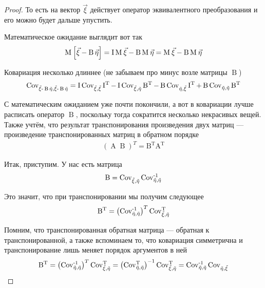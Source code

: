 \begin{proof}
  То есть на вектор $\vec{\xi}$ действует оператор эквивалентного
  преобразования и его можно будет дальше упустить.

  Математическое ожидание выглядит вот так
  \begin{align*}
      \Mean{\vec{\xi} - \operatorname{B} \vec{\eta}}
      = \operatorname{I} \mean{\vec{\xi}} - \operatorname{B} \mean{\vec{\eta}}
      = \mean{\vec{\xi}} - \operatorname{B} \mean{\vec{\eta}}
  \end{align*}

  Ковариация несколько длиннее (не забываем про минус возле матрицы
  $\operatorname{B}$)
  \begin{equation}\label{eq:gaussianVector:independent:covariation}
      \dCov{\vec{\xi} - \operatorname{B} \vec{\eta}}
      = \operatorname{I} \dCov{\vec{\xi}} \operatorname{I^T}
      - \operatorname{I} \Cov{\vec{\xi}}{\vec{\eta}} \operatorname{B^T}
      - \operatorname{B} \Cov{\vec{\eta}}{\vec{\xi}} \operatorname{I^T}
      + \operatorname{B} \dCov{\vec{\eta}} \operatorname{B^T}
  \end{equation}

  С математическим ожиданием уже почти покончили, а вот в ковариации лучше
  расписать оператор $\operatorname{B}$, поскольку тогда сократится несколько
  некрасивых вещей. Также учтём, что результат транспонирования произведения
  двух матриц --- произведение транспонированных матриц в обратном порядке
  \begin{align*}
      \left( \operatorname{A} \operatorname{B} \right)^T
      = \operatorname{B^T} \operatorname{A^T}
  \end{align*}

  Итак, приступим. У нас есть матрица
  \begin{align*}
      \operatorname{B} = \Cov{\vec{\xi}}{\vec{\eta}} \dCov[-1]{\vec{\eta}}
  \end{align*}

  Это значит, что при транспонировании мы получим следующее
  \begin{align*}
      \operatorname{B^T}
      = \left( \dCov[-1]{\vec{\eta}} \right)^T
          \Cov[T]{\vec{\xi}}{\vec{\eta}}
  \end{align*}

  Помним, что транспонированная обратная матрица --- обратная к
  транспонированной, а также вспоминаем то, что ковариация симметрична
  и транспонирование лишь меняет порядок аргументов в ней
  \begin{align*}
      \operatorname{B^T}
      = \left( \dCov[-1]{\vec{\eta}} \right)^T
          \Cov[T]{\vec{\xi}}{\vec{\eta}}
      = \left( \dCov[T]{\vec{\eta}} \right)^{-1}
          \Cov[T]{\vec{\xi}}{\vec{\eta}}
      = \dCov[-1]{\vec{\eta}} \Cov{\vec{\eta}}{\vec{\xi}}
  \end{align*}


\end{proof}
